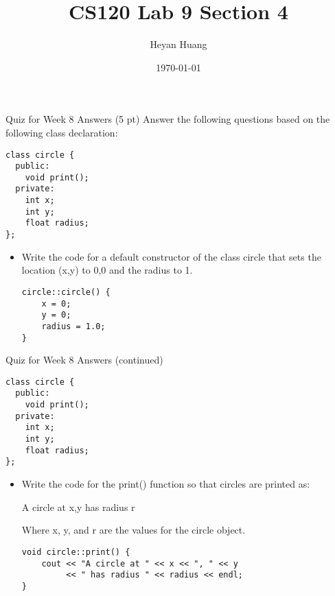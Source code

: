 \documentclass[presentation]{beamer}
\author{Heyan Huang}
\date{\today}
\title{CS120 Lab \alert{9} Section \alert{4}}
\begin{document}
\maketitle

\begin{frame}[fragile,label=sec-1]{Quiz for Week 8 \alert{Answers}}
 (5 pt) Answer the following questions based on the following class declaration:
\begin{verbatim}
class circle {
  public:
    void print();
  private:
    int x;
    int y;
    float radius;
};
\end{verbatim}

\begin{itemize}
\item Write the code for a default constructor of the class circle that sets the location (x,y) to 0,0 and the radius to 1.
\begin{verbatim}
circle::circle() {
    x = 0;
    y = 0;
    radius = 1.0;
}
\end{verbatim}
\end{itemize}
\end{frame}

\begin{frame}[fragile,label=sec-2]{Quiz for Week 8 \alert{Answers} (continued)}
 \begin{verbatim}
class circle {
  public:
    void print();
  private:
    int x;
    int y;
    float radius;
};
\end{verbatim}
\begin{itemize}
\item Write the code for the print() function so that circles are printed as: 

\alert{A circle at x,y has radius r} 

Where x, y, and r are the values for the circle object.

\begin{verbatim}
void circle::print() {
    cout << "A circle at " << x << ", " << y
         << " has radius " << radius << endl;
}
\end{verbatim}
\end{itemize}
\end{frame}
\end{document}
